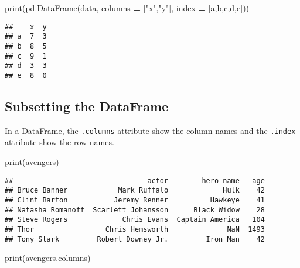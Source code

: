 \documentclass[
]{book}
\newenvironment{Shaded}{\begin{snugshade}}{\end{snugshade}}
\newcommand{\BuiltInTok}[1]{#1}
\newcommand{\NormalTok}[1]{#1}
\newcommand{\OperatorTok}[1]{\textcolor[rgb]{0.81,0.36,0.00}{\textbf{#1}}}
\newcommand{\StringTok}[1]{\textcolor[rgb]{0.31,0.60,0.02}{#1}}
\begin{document}
\begin{Shaded}
\begin{Highlighting}[]
\BuiltInTok{print}\NormalTok{(pd.DataFrame(data, columns }\OperatorTok{=}\NormalTok{ [}\StringTok{"x"}\NormalTok{,}\StringTok{"y"}\NormalTok{], index }\OperatorTok{=}\NormalTok{ [}\StringTok{\textquotesingle{}a\textquotesingle{}}\NormalTok{,}\StringTok{\textquotesingle{}b\textquotesingle{}}\NormalTok{,}\StringTok{\textquotesingle{}c\textquotesingle{}}\NormalTok{,}\StringTok{\textquotesingle{}d\textquotesingle{}}\NormalTok{,}\StringTok{\textquotesingle{}e\textquotesingle{}}\NormalTok{]))}
\end{Highlighting}
\end{Shaded}

\begin{verbatim}
##    x  y
## a  7  3
## b  8  5
## c  9  1
## d  3  3
## e  8  0
\end{verbatim}

\hypertarget{subsetting-the-dataframe}{%
\subsection{Subsetting the DataFrame}\label{subsetting-the-dataframe}}

In a DataFrame, the \texttt{.columns} attribute show the column names and the \texttt{.index} attribute
show the row names.

\begin{Shaded}
\begin{Highlighting}[]
\BuiltInTok{print}\NormalTok{(avengers)}
\end{Highlighting}
\end{Shaded}

\begin{verbatim}
##                                actor        hero name   age
## Bruce Banner            Mark Ruffalo             Hulk    42
## Clint Barton           Jeremy Renner          Hawkeye    41
## Natasha Romanoff  Scarlett Johansson      Black Widow    28
## Steve Rogers             Chris Evans  Captain America   104
## Thor                 Chris Hemsworth              NaN  1493
## Tony Stark         Robert Downey Jr.         Iron Man    42
\end{verbatim}

\begin{Shaded}
\begin{Highlighting}[]
\BuiltInTok{print}\NormalTok{(avengers.columns)}
\end{Highlighting}
\end{Shaded}
\end{document}
